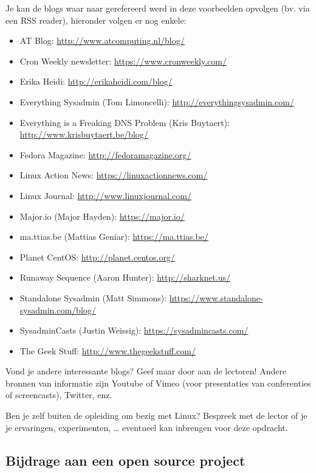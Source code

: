 Je kan de blogs waar naar gerefereerd werd in deze voorbeelden opvolgen (bv. via een RSS reader), hieronder volgen er nog enkele:

\begin{itemize}
\item AT Blog: \url{http://www.atcomputing.nl/blog/}
\item Cron Weekly newsletter: \url{https://www.cronweekly.com/}
\item Erika Heidi: \url{http://erikaheidi.com/blog/}
\item Everything Sysadmin (Tom Limoncelli): \url{http://everythingsysadmin.com/}
\item Everything is a Freaking DNS Problem (Kris Buytaert): \url{http://www.krisbuytaert.be/blog/}
\item Fedora Magazine: \url{http://fedoramagazine.org/}
\item Linux Action News: \url{https://linuxactionnews.com/}
\item Linux Journal: \url{http://www.linuxjournal.com/}
\item Major.io (Major Hayden): \url{https://major.io/}
\item ma.ttias.be (Mattias Geniar): \url{https://ma.ttias.be/}
\item Planet CentOS: \url{http://planet.centos.org/}
\item Runaway Sequence (Aaron Hunter): \url{http://sharknet.us/}
\item Standalone Sysadmin (Matt Simmons): \url{https://www.standalone-sysadmin.com/blog/}
\item SysadminCasts (Justin Weissig): \url{https://sysadmincasts.com/}
\item The Geek Stuff: \url{http://www.thegeekstuff.com/}
\end{itemize}

Vond je andere interessante blogs? Geef maar door aan de lectoren! Andere bronnen van informatie zijn Youtube of Vimeo (voor presentaties van conferenties of screencasts), Twitter, enz.

Ben je zelf buiten de opleiding om bezig met Linux? Bespreek met de lector of je je ervaringen, experimenten, \ldots{} eventueel kan inbrengen voor deze opdracht.

\subsection{Bijdrage aan een open source project}
\label{subs:bijdrage-aan-een-open-source-project}

